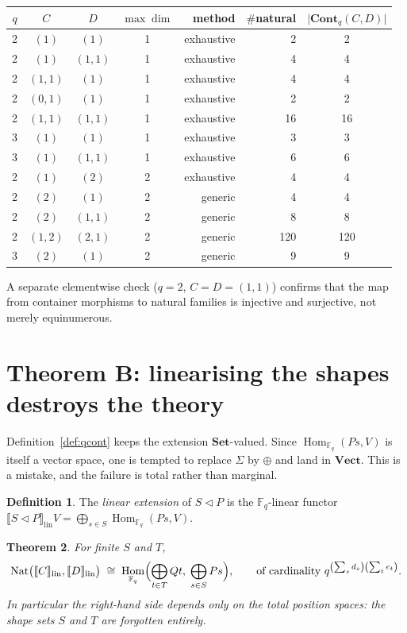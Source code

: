 \documentclass[11pt,a4paper]{article}
\newtheorem{theorem}{Theorem}[section]
\theoremstyle{definition}
\newtheorem{definition}[theorem]{Definition}
\theoremstyle{remark}
\newcommand{\FF}{\mathbb{F}}
\newcommand{\cat}[1]{\mathbf{#1}}
\newcommand{\Set}{\cat{Set}}
\newcommand{\Vect}{\cat{Vect}}
\newcommand{\Cont}{\cat{Cont}}
\newcommand{\ext}[1]{\llbracket #1 \rrbracket}
\newcommand{\con}{\triangleleft}
\DeclareMathOperator{\Hom}{Hom}
\DeclareMathOperator{\Nat}{Nat}
\begin{document}
\begin{center}
\small
\setlength{\tabcolsep}{4.5pt}
\begin{tabular}{ccccrrc}
\toprule
$q$ & $C$ & $D$ & $\max\dim$ & method & $\#$natural & $\lvert\Cont_q(C,D)\rvert$ \\
\midrule
2 & $(1)$ & $(1)$ & 1 & exhaustive & 2 & 2 \\
2 & $(1)$ & $(1,1)$ & 1 & exhaustive & 4 & 4 \\
2 & $(1,1)$ & $(1)$ & 1 & exhaustive & 4 & 4 \\
2 & $(0,1)$ & $(1)$ & 1 & exhaustive & 2 & 2 \\
2 & $(1,1)$ & $(1,1)$ & 1 & exhaustive & 16 & 16 \\
3 & $(1)$ & $(1)$ & 1 & exhaustive & 3 & 3 \\
3 & $(1)$ & $(1,1)$ & 1 & exhaustive & 6 & 6 \\
2 & $(1)$ & $(2)$ & 2 & exhaustive & 4 & 4 \\
2 & $(2)$ & $(1)$ & 2 & generic & 4 & 4 \\
2 & $(2)$ & $(1,1)$ & 2 & generic & 8 & 8 \\
2 & $(1,2)$ & $(2,1)$ & 2 & generic & 120 & 120 \\
3 & $(2)$ & $(1)$ & 2 & generic & 9 & 9 \\
\bottomrule
\end{tabular}
\end{center}

\noindent
A separate elementwise check ($q=2$, $C = D = (1,1)$) confirms that the map from
container morphisms to natural families is injective and surjective, not merely
equinumerous.

\section{Theorem B: linearising the shapes destroys the theory}

Definition~\ref{def:qcont} keeps the extension $\Set$-valued. Since
$\Hom_{\FF_q}(P s, V)$ is itself a vector space, one is tempted to replace
$\Sigma$ by $\oplus$ and land in $\Vect$. This is a mistake, and the failure is
total rather than marginal.

\begin{definition}
The \emph{linear extension} of $S \con P$ is the $\FF_q$-linear functor
$\ext{S \con P}_{\mathrm{lin}} V = \bigoplus_{s \in S} \Hom_{\FF_q}(P s, V)$.
\end{definition}

\begin{theorem}\label{thm:B}
For finite $S$ and $T$,
\[
  \Nat\bigl(\ext{C}_{\mathrm{lin}}, \ext{D}_{\mathrm{lin}}\bigr)
  \;\cong\; \Hom_{\FF_q}\Bigl( \bigoplus_{t \in T} Q t,\; \bigoplus_{s \in S} P s \Bigr),
  \qquad
  \text{of cardinality } q^{\left(\sum_s d_s\right)\left(\sum_t e_t\right)}.
\]
In particular the right-hand side depends only on the \emph{total position
spaces}: the shape sets $S$ and $T$ are forgotten entirely.
\end{theorem}
\end{document}
